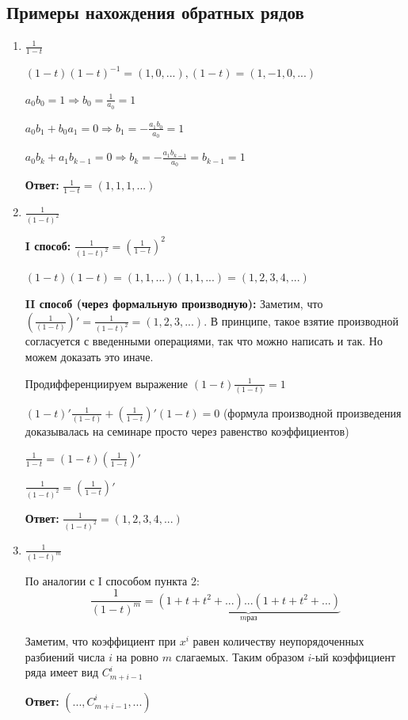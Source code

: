 \subsection*{Примеры нахождения обратных рядов}
\begin{enumerate}
    \item $\frac{1}{1-t}$
    \par $(1-t)(1-t)^{-1}=(1, 0, ...), (1-t)=(1, -1, 0, ...)$
    \par $a_0 b_0 = 1 \Rightarrow b_0=\frac{1}{a_0}=1$
    \par $a_0 b_1+b_0 a_1=0 \Rightarrow b_1=-\frac{a_1 b_0}{a_0}=1$
    \par $a_0 b_k + a_1 b_{k-1}=0 \Rightarrow b_k=-\frac{a_1 b_{k-1}}{a_0}=b_{k-1}=1$
    \par \textbf{Ответ:} $\frac{1}{1-t}=(1, 1, 1, ...)$
    \item $\frac{1}{(1-t)^2}$
    \par \textbf{I способ:} $\frac{1}{(1-t)^2}=(\frac{1}{1-t})^2$
    \par $(1-t)(1-t)=(1, 1, ...)(1, 1, ...)=(1, 2, 3, 4, ...)$
    \par \textbf{II способ (через формальную производную):} Заметим, что $(\frac{1}{(1-t)})'=\frac{1}{(1-t)^2}=(1, 2, 3, ...)$. В принципе, такое взятие производной согласуется с введенными операциями, так что можно написать и так. Но можем доказать это иначе.
    \par Продифференциируем выражение $(1-t) \frac{1}{(1-t)}=1$
    \par $(1-t)'\frac{1}{(1-t)} + (\frac{1}{1-t})'(1-t)=0$ (формула производной произведения доказывалась на семинаре просто через равенство коэффициентов)
    \par $\frac{1}{1-t}=(1-t)(\frac{1}{1-t})'$
    \par $\frac{1}{(1-t)^2}=(\frac{1}{1-t})'$
    \par \textbf{Ответ:} $\frac{1}{(1-t)^2}=(1, 2, 3, 4, ...)$
    \item $\frac{1}{(1-t)^m}$
    \par По аналогии с I способом пункта 2: 
    $$\frac{1}{(1-t)^m} = \underbrace{(1+t+t^2+...)...(1+t+t^2+...)}_{m раз}$$
    \par Заметим, что коэффициент при $x^i$ равен количеству неупорядоченных разбиений числа $i$ на ровно $m$ слагаемых. Таким образом $i$-ый коэффициент ряда имеет вид $C^{i}_{m+i-1}$
    \par \textbf{Ответ:} $(..., C^{i}_{m+i-1}, ...)$
\end{enumerate}

